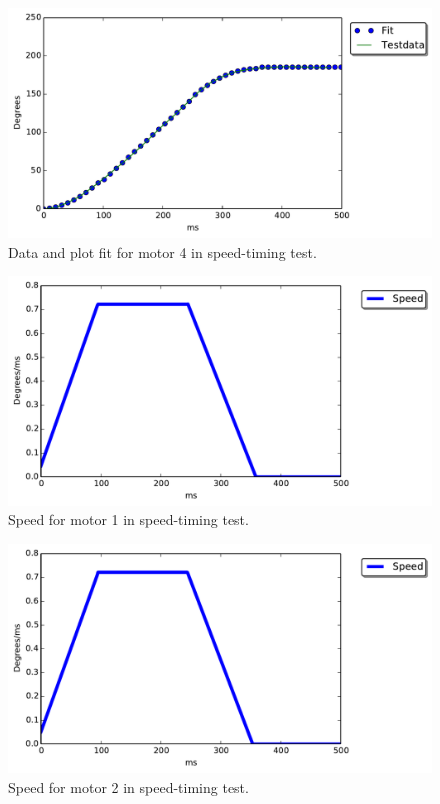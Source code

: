 \begin{figure}[ht]
\includegraphics[width=\textwidth]{test_res/speed_tests/Data_and_fit_motor4.pdf}
\caption{Data and plot fit for motor 4 in speed-timing test.}
\label{fig:fit_4}
\end{figure}

\begin{figure}[ht]
\includegraphics[width=\textwidth]{test_res/speed_tests/Speed_motor1.pdf}
\caption{Speed for motor 1 in speed-timing test.}
\label{fig:speed1}
\end{figure}

\begin{figure}[ht]
\includegraphics[width=\textwidth]{test_res/speed_tests/Speed_motor2.pdf}
\caption{Speed for motor 2 in speed-timing test.}
\label{fig:speed_2}
\end{figure}

